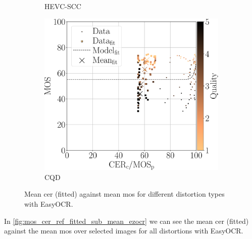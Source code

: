 \begin{figure}[h]
\begin{subfigure}[b]{0.3\textwidth}
        \caption{HEVC-SCC}
        \label{fig:mos_cer_ref_fitted_mean_ezocr_HEVC-SCC}
    \end{subfigure}
    \hfill
    \begin{subfigure}[b]{0.3\textwidth}
        \includegraphics[width=\textwidth]{../../images/analyze/mos_cer_ref_fitted_mean_ezocr_CQD.pdf}
        \caption{CQD}
        \label{fig:mos_cer_ref_fitted_mean_ezocr_CQD}
    \end{subfigure}
    \caption{Mean \gls{cer} (fitted) against mean \gls{mos} for different distortion types with EasyOCR.}
\label{fig:mos_cer_ref_fitted_mean_ezocr}
\end{figure}

In \autoref{fig:mos_cer_ref_fitted_sub_mean_ezocr} we can see the mean \gls{cer} (fitted) against the mean \gls{mos} over selected images for all distortions with EasyOCR.

